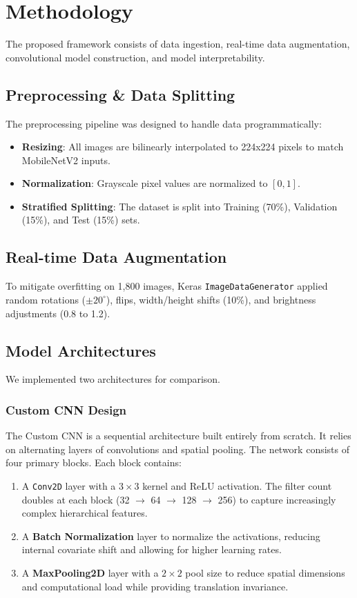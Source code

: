 \documentclass[conference, a4paper]{IEEEtran}
\begin{document}
\section{Methodology}
The proposed framework consists of data ingestion, real-time data augmentation, convolutional model construction, and model interpretability.

\subsection{Preprocessing \& Data Splitting}
The preprocessing pipeline was designed to handle data programmatically:
\begin{itemize}
    \item \textbf{Resizing}: All images are bilinearly interpolated to 224x224 pixels to match MobileNetV2 inputs.
    \item \textbf{Normalization}: Grayscale pixel values are normalized to $[0, 1]$.
    \item \textbf{Stratified Splitting}: The dataset is split into Training (70\%), Validation (15\%), and Test (15\%) sets.
\end{itemize}

\subsection{Real-time Data Augmentation}
To mitigate overfitting on 1,800 images, Keras \texttt{ImageDataGenerator} applied random rotations ($\pm 20^{\circ}$), flips, width/height shifts (10\%), and brightness adjustments (0.8 to 1.2).

\subsection{Model Architectures}
We implemented two architectures for comparison.

\subsubsection{Custom CNN Design}
The Custom CNN is a sequential architecture built entirely from scratch. It relies on alternating layers of convolutions and spatial pooling.
The network consists of four primary blocks. Each block contains:
\begin{enumerate}
    \item A \texttt{Conv2D} layer with a $3\times3$ kernel and ReLU activation. The filter count doubles at each block (32 $\rightarrow$ 64 $\rightarrow$ 128 $\rightarrow$ 256) to capture increasingly complex hierarchical features.
    \item A \textbf{Batch Normalization} layer to normalize the activations, reducing internal covariate shift and allowing for higher learning rates.
    \item A \textbf{MaxPooling2D} layer with a $2\times2$ pool size to reduce spatial dimensions and computational load while providing translation invariance.
\end{enumerate}
\end{document}
